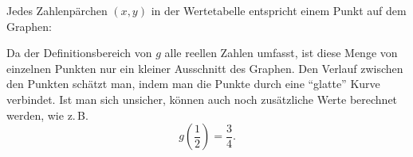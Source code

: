 Jedes Zahlenpärchen \((x, y)\) in der Wertetabelle entspricht
einem Punkt auf dem Graphen:
\begin{center}
\end{center}

Da der Definitionsbereich von \(g\) alle reellen Zahlen umfasst,
ist diese Menge von einzelnen Punkten nur ein kleiner Ausschnitt
des Graphen. Den Verlauf zwischen den Punkten schätzt man,
indem man die Punkte durch eine \enquote{glatte} Kurve verbindet.
Ist man sich unsicher, können auch noch zusätzliche Werte
berechnet werden, wie z.\,B.
\[
    g\left(\frac{1}{2}\right)=\frac{3}{4}.
\]

